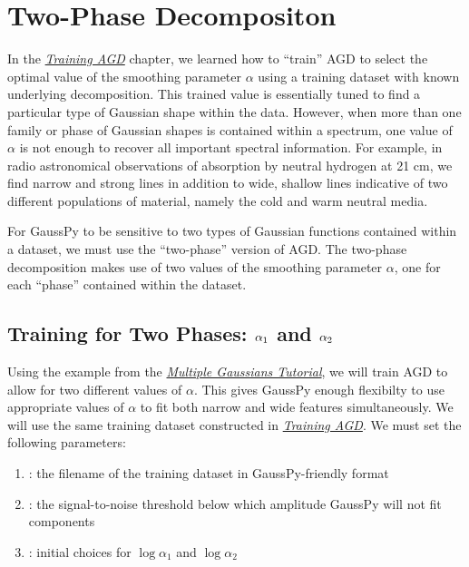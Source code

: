 \documentclass[letterpaper,10pt,openany,oneside]{sphinxmanual}
\begin{document}
\chapter{Two-Phase Decompositon}
\label{tutorial:two-phase-decomposition}\label{tutorial:two-phase-decompositon}
In the {\hyperref[tutorial:training\string-example]{\emph{Training AGD}}} chapter, we learned how to ``train'' AGD to select
the optimal value of the smoothing parameter \(\alpha\) using a training
dataset with known underlying decomposition. This trained value is essentially
tuned to find a particular type of Gaussian shape within the data. However, when
more than one family or phase of Gaussian shapes is contained within a spectrum,
one value of \(\alpha\) is not enough to recover all important spectral
information. For example, in radio astronomical observations of absorption by
neutral hydrogen at 21 cm, we find narrow and strong lines in addition to wide,
shallow lines indicative of two different populations of material, namely the
cold and warm neutral media.

For GaussPy to be sensitive to two types of Gaussian functions contained within
a dataset, we must use the ``two-phase'' version of AGD. The two-phase
decomposition makes use of two values of the smoothing parameter \(\alpha\),
one for each ``phase'' contained within the dataset.


\section{Training for Two Phases: \protect\(\alpha_1\protect\) and \protect\(\alpha_2\protect\)}
\label{tutorial:training-for-two-phases-and}
Using the example from the {\hyperref[tutorial:multiple\string-gaussians\string-tutorial]{\emph{Multiple Gaussians Tutorial}}}, we will train AGD
to allow for two different values of \(\alpha\). This gives GaussPy enough
flexibilty to use appropriate values of \(\alpha\) to fit both narrow and
wide features simultaneously. We will use the same training dataset constructed
in {\hyperref[tutorial:training\string-example]{\emph{Training AGD}}}. We must set the following parameters:
\begin{enumerate}
\item {} 
: the filename of the training dataset in GaussPy-friendly
format

\item {} 
: the signal-to-noise threshold below which amplitude GaussPy
will not fit components

\item {} 
: initial choices for \(\log\alpha_1\) and
\(\log\alpha_2\)

\end{enumerate}
\end{document}
